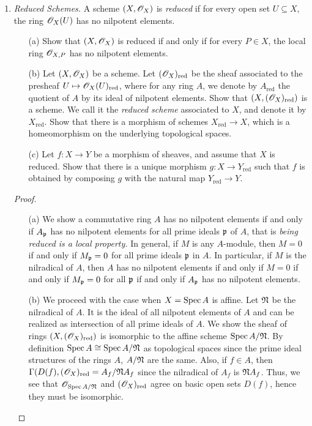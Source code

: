 \documentclass{article}
\begin{document}
\begin{enumerate} [label=\textbf{\arabic*.}, leftmargin=0em]
\item \textit{Reduced Schemes.} A scheme $(X, \mathscr{O}_X)$ is \textit{reduced} if for every open set $U \subseteq X$, the ring $\mathscr{O}_X(U)$ has no nilpotent elements.
\begin{itemize}
    \item[(a)] Show that $(X, \mathscr{O}_X)$ is reduced if and only if for every $P \in X$, the local ring $\mathscr{O}_{X, P}$ has no nilpotent elements.
    \item[(b)] Let $(X, \mathscr{O}_X)$ be a scheme. Let $(\mathscr{O}_X)_\text{red}$ be the sheaf associated to the presheaf $U \mapsto \mathscr{O}_X(U)_\text{red}$, where for any ring $A$, we denote by $A_\text{red}$ the quotient of $A$ by its ideal of nilpotent elements. Show that $(X, (\mathscr{O}_X)_\text{red})$ is a scheme. We call it the \textit{reduced scheme} associated to $X$, and denote it by $X_\text{red}$. Show that there is a morphism of schemes $X_\text{red} \to X$, which is a homeomorphism on the underlying topological spaces.
    \item[(c)] Let $f : X \to Y$ be a morphism of sheaves, and assume that $X$ is reduced. Show that there is a unique morphism $g : X \to Y_\text{red}$ such that $f$ is obtained by composing $g$ with the natural map $Y_\text{red} \to Y$.
\end{itemize}

\begin{proof} $ $ \vspace{0pt}
   \begin{itemize} [leftmargin=0cm]
    \item[(a)] We show a commutative ring $A$ has no nilpotent elements if and only if $A_{\mathfrak{p}}$ has no nilpotent elements for all prime ideals $\mathfrak{p}$ of $A$, that is \textit{being reduced is a local property.} In general, if $M$ is any $A$-module, then $M = 0$ if and only if $M_{\mathfrak{p}} = 0$ for all prime ideals $\mathfrak{p}$ in $A$. In particular, if $M$ is the nilradical of $A$, then $A$ has no nilpotent elements if and only if $M = 0$ if and only if $M_{\mathfrak{p}} = 0$ for all $\mathfrak{p}$ if and only if $A_{\mathfrak{p}}$ has no nilpotent elements.

    \item[(b)] We proceed with the case when $X = \operatorname{Spec}{A}$ is affine. Let $\mathfrak{N}$ be the nilradical of $A$. It is the ideal of all nilpotent elements of $A$ and can be realized as intersection of all prime ideals of $A$. We show the sheaf of rings $(X, (\mathscr{O}_X)_\text{red})$ is isomorphic to the affine scheme $\operatorname{Spec}{A / \mathfrak{N}}$. By definition $\operatorname{Spec}{A} \cong \operatorname{Spec}{A / \mathfrak{N}}$ as topological spaces since the prime ideal structures of the rings $A$, $A / \mathfrak{N}$ are the same. Also, if $f \in A$, then $\Gamma(D(f), (\mathscr{O}_X)_\text{red} = A_f / \mathfrak{N} A_f$ since the nilradical of $A_f$ is $\mathfrak{N} A_f$. Thus, we see that $\mathscr{O}_{\operatorname{Spec}{A / \mathfrak{N}}}$ and $(\mathscr{O}_X)_\text{red}$ agree on basic open sets $D(f)$, hence they must be isomorphic.
    

\end{itemize}
\end{proof}
\end{enumerate}
\end{document}
